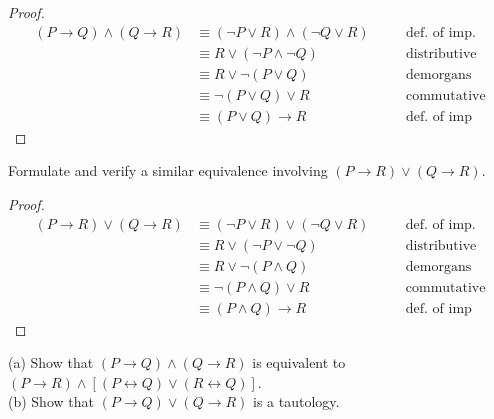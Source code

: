 \begin{proof}
\begin{align*}
(P \rightarrow Q) \wedge (Q \rightarrow R) 
    &\equiv  (\neg P \vee R) \wedge (\neg Q \vee R) && \quad \text {def. of imp.} \\
&\equiv R \vee (\neg P \wedge \neg Q) && \quad \text {distributive} \\
&\equiv R \vee \neg(P \vee Q) && \quad \text {demorgans} \\
&\equiv \neg(P \vee Q) \vee R && \quad \text {commutative} \\
&\equiv (P \vee Q) \rightarrow R && \quad \text {def. of imp}
\end{align*}
\end{proof}

\begin{tcolorbox}[title=Problem 7 (b), breakable]
Formulate and verify a similar equivalence involving 
$(P \rightarrow R) \vee (Q \rightarrow R)$.
\end{tcolorbox}

\begin{proof}
\begin{align*}
(P \rightarrow R) \vee (Q \rightarrow R)
    &\equiv  (\neg P \vee R) \vee (\neg Q \vee R) && \quad \text {def. of imp.} \\
&\equiv R \vee (\neg P \vee \neg Q) && \quad \text {distributive} \\
&\equiv R \vee \neg(P \wedge Q) && \quad \text {demorgans} \\
&\equiv \neg(P \wedge Q) \vee R && \quad \text {commutative} \\
&\equiv (P \wedge Q) \rightarrow R && \quad \text {def. of imp}
\end{align*}
\end{proof}

\begin{tcolorbox}[title=Problem 8 (a), breakable]
(a) Show that $(P \rightarrow Q) \wedge (Q \rightarrow R)$ is equivalent to 
$(P \rightarrow R) \wedge [(P \leftrightarrow Q) \vee (R \leftrightarrow Q)]$. \\
(b) Show that $(P \rightarrow Q) \vee (Q \rightarrow R)$ is a tautology.
\end{tcolorbox}

